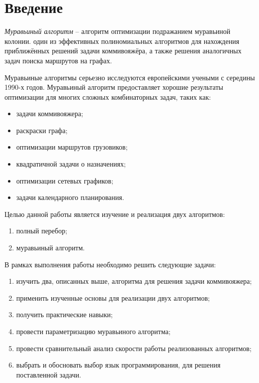 \newpage
\chapter*{Введение}

\textit{Муравьиный алгоритм} -- алгоритм оптимизации подражанием муравьиной колонии.
один из эффективных полиномиальных алгоритмов
для нахождения приближённых решений задачи коммивояжёра,
а также решения аналогичных задач поиска маршрутов на графах.

Муравьиные алгоритмы серьезно исследуются европейскими учеными с середины 1990-х годов.
Муравьиный алгоритм предоставляет хорошие результаты оптимизации для
многих сложных комбинаторных задач, таких как:

\begin{itemize}
	\item задачи коммивояжера;
	\item раскраски графа;
	\item оптимизации маршрутов грузовиков;
	\item квадратичной задачи о назначениях;
	\item оптимизации сетевых графиков;
	\item задачи календарного планирования.
\end{itemize}


Целью данной работы является изучение и реализация двух алгоритмов:

\begin{enumerate}
	\item полный перебор;
	\item муравьиный алгоритм.
\end{enumerate}

В рамках выполнения работы необходимо решить следующие задачи:

\begin{enumerate}
	\item изучить два, описанных выше, алгоритма для решения задачи коммивояжера;
	\item применить изученные основы для реализации двух алгоритмов;
	\item получить практические навыки;
	\item провести параметризацию муравьиного алгоритма;
	\item провести сравнительный анализ скорости работы реализованных алгоритмов;
	\item выбрать и обосновать выбор язык программирования, для решения поставленной задачи.
\end{enumerate}